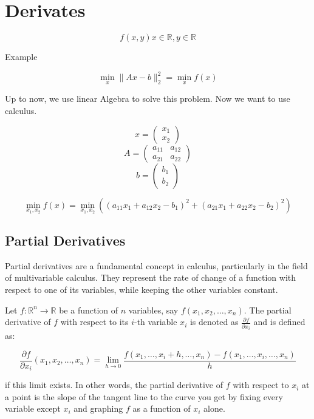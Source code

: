 \chapter{Derivates}
$$ f(x,y) x \in \mathbb{R}, y \in \mathbb{R} $$


Example

$$ \min_{x} \|Ax-b\|^2_2 = \min_x f(x) $$

Up to now, we use linear Algebra to solve this problem.
Now we want to use calculus.



$$
x = \begin{pmatrix}
x_1 \\
x_2
\end{pmatrix}
$$
$$
A = \begin{pmatrix}
a_{11} & a_{12} \\
a_{21} & a_{22}
\end{pmatrix}
$$
$$
b = \begin{pmatrix}
b_1 \\
b_2
\end{pmatrix}
$$

$$
\min_{x_1, x_2} f(x) = \min_{x_1, x_2} \left( (a_{11}x_1 + a_{12}x_2 - b_1)^2 + (a_{21}x_1 + a_{22}x_2 - b_2)^2 \right)
$$


\section{Partial Derivatives}

Partial derivatives are a fundamental concept in calculus, particularly in the field of multivariable calculus. They represent the rate of change of a function with respect to one of its variables, while keeping the other variables constant.

Let \( f: \mathbb{R}^n \rightarrow \mathbb{R} \) be a function of \( n \) variables, say \( f(x_1, x_2, \ldots, x_n) \). The partial derivative of \( f \) with respect to its \( i \)-th variable \( x_i \) is denoted as \( \frac{\partial f}{\partial x_i} \) and is defined as:

\[
\frac{\partial f}{\partial x_i}(x_1, x_2, \ldots, x_n) = \lim_{h \rightarrow 0} \frac{f(x_1, \ldots, x_i + h, \ldots, x_n) - f(x_1, \ldots, x_i, \ldots, x_n)}{h}
\]

if this limit exists. In other words, the partial derivative of \( f \) with respect to \( x_i \) at a point is the slope of the tangent line to the curve you get by fixing every variable except \( x_i \) and graphing \( f \) as a function of \( x_i \) alone.

